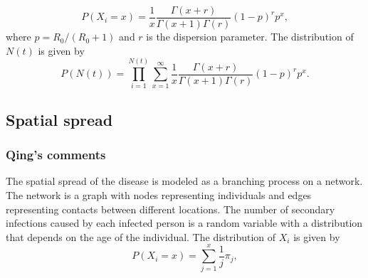 \documentclass{article}
\begin{document}
\begin{equation}
P(X_i = x) = \frac{1}{x} \frac{\Gamma(x+r)}{\Gamma(x+1) \Gamma(r)} (1-p)^r p^x,
\end{equation}
where $p = R_{0} / (R_{0} + 1)$ and $r$ is the dispersion parameter. The distribution of $N(t)$ is given by
\begin{equation}
P(N(t)) = \prod_{i=1}^{N(t)} \sum_{x=1}^{\infty} \frac{1}{x} \frac{\Gamma(x+r)}{\Gamma(x+1) \Gamma(r)} (1-p)^r p^x.
\end{equation}

\subsection{Spatial spread}
\subsubsection*{Qing's comments}
The spatial spread of the disease is modeled as a branching process on a network. The network is a graph with nodes representing individuals and edges representing contacts between different locations. The number of secondary infections caused by each infected person is a random variable with a distribution that depends on the age of the individual. The distribution of $X_i$ is given by
\begin{equation}
P(X_i = x) = \sum_{j=1}^{x} \frac{1}{j} \pi_j,
\end{equation}

\printbibliography
\end{document}
